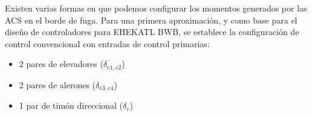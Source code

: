 Existen varias formas en que podemos configurar los  momentos generados por las ACS en el borde de fuga. 
Para una primera aproximación, y como base para el diseño de controladores para EHEKATL BWB, se establece la configuración de control convencional con entradas de control primarias: 
\begin{itemize}
    \item 2 pares de elevadores  ($\delta_{e1,e2}$)
    \item 2 pares de alerones  ($\delta_{e3,e4}$)
    \item 1 par de timón direccional  ($\delta_{r}$)
\end{itemize}


